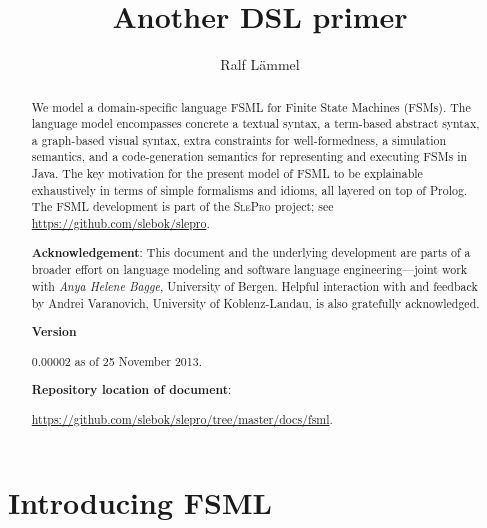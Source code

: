\documentclass[preprint,authoryear,12pt]{noelsarticle}
\newcommand{\slepro}{\textsc{SlePro}}
\begin{document}
\begin{frontmatter}

\title{Another DSL primer}

\author{Ralf L\"ammel}

\address{Software Languages Team\\University of Koblenz-Landau, Germany}

\begin{abstract}
  We model a domain-specific language FSML for Finite State Machines
  (FSMs). The language model encompasses concrete a textual syntax, a
  term-based abstract syntax, a graph-based visual syntax, extra
  constraints for well-formedness, a simulation semantics, and a
  code-generation semantics for representing and executing FSMs in
  Java. The key motivation for the present model of FSML to be
  explainable exhaustively in terms of simple formalisms and idioms,
  all layered on top of Prolog. The FSML development is part of the
  \slepro{} project; see \url{https://github.com/slebok/slepro}.

\bigskip

\noindent
\textbf{Acknowledgement}: {\small This document and the underlying
  development are parts of a broader effort on language modeling and
  software language engineering---joint work with \emph{Anya Helene
    Bagge}, University of Bergen. Helpful interaction with and
  feedback by Andrei Varanovich, University of Koblenz-Landau, is also
  gratefully acknowledged.}

\medskip

\noindent
\textbf{Version}

0.00002 as of 25 November 2013.

\medskip

\noindent
\textbf{Repository location of document}: 

\url{https://github.com/slebok/slepro/tree/master/docs/fsml}.
\end{abstract}

\end{frontmatter}

\pagebreak


\tableofcontents

\pagebreak


\section{Introducing FSML}
\end{document}
